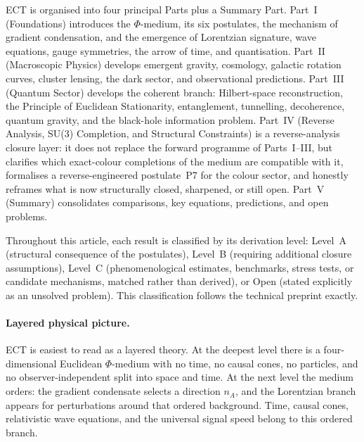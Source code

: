 \documentclass[11pt,a4paper]{article}
\begin{document}
ECT is organised into four principal Parts plus a Summary Part. Part~I (Foundations) introduces the $\Phi$-medium, its six postulates, the mechanism of gradient condensation, and the emergence of Lorentzian signature, wave equations, gauge symmetries, the arrow of time, and quantisation. Part~II (Macroscopic Physics) develops emergent gravity, cosmology, galactic rotation curves, cluster lensing, the dark sector, and observational predictions. Part~III (Quantum Sector) develops the coherent branch: Hilbert-space reconstruction, the Principle of Euclidean Stationarity, entanglement, tunnelling, decoherence, quantum gravity, and the black-hole information problem. Part~IV (Reverse Analysis, SU(3) Completion, and Structural Constraints) is a reverse-analysis closure layer: it does not replace the forward programme of Parts~I--III, but clarifies which exact-colour completions of the medium are compatible with it, formalises a reverse-engineered postulate~P7 for the colour sector, and honestly reframes what is now structurally closed, sharpened, or still open. Part~V (Summary) consolidates comparisons, key equations, predictions, and open problems.

Throughout this article, each result is classified by its derivation level: Level~A (structural consequence of the postulates), Level~B (requiring additional closure assumptions), Level~C (phenomenological estimates, benchmarks, stress tests, or candidate mechanisms, matched rather than derived), or Open (stated explicitly as an unsolved problem). This classification follows the technical preprint exactly.

\medskip
\noindent{}

\paragraph{Layered physical picture.}
ECT is easiest to read as a layered theory. At the deepest level
there is a four-dimensional Euclidean $\Phi$-medium with no time,
no causal cones, no particles, and no observer-independent split
into space and time. At the next level the medium orders: the
gradient condensate selects a direction $n_A$, and the Lorentzian
branch appears for perturbations around that ordered background.
Time, causal cones, relativistic wave equations, and the universal
signal speed belong to this ordered branch.
\end{document}
